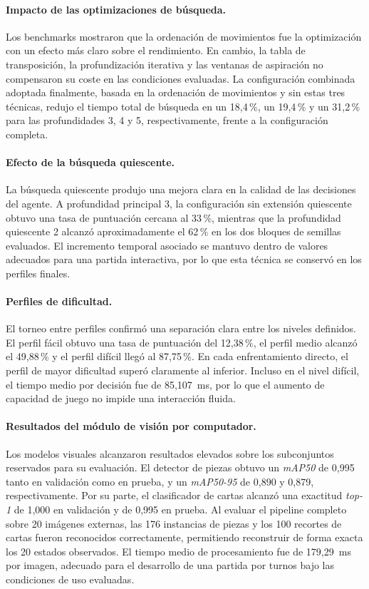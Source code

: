 \paragraph{Impacto de las optimizaciones de búsqueda.}
Los benchmarks mostraron que la ordenación de movimientos fue la optimización con un efecto más claro sobre el rendimiento. En cambio, la tabla de transposición, la profundización iterativa y las ventanas de aspiración no compensaron su coste en las condiciones evaluadas. La configuración combinada adoptada finalmente, basada en la ordenación de movimientos y sin estas tres técnicas, redujo el tiempo total de búsqueda en un 18,4\,\%, un 19,4\,\% y un 31,2\,\% para las profundidades 3, 4 y 5, respectivamente, frente a la configuración completa.

\paragraph{Efecto de la búsqueda quiescente.}
La búsqueda quiescente produjo una mejora clara en la calidad de las decisiones del agente. A profundidad principal 3, la configuración sin extensión quiescente obtuvo una tasa de puntuación cercana al 33\,\%, mientras que la profundidad quiescente 2 alcanzó aproximadamente el 62\,\% en los dos bloques de semillas evaluados. El incremento temporal asociado se mantuvo dentro de valores adecuados para una partida interactiva, por lo que esta técnica se conservó en los perfiles finales.

\paragraph{Perfiles de dificultad.}
El torneo entre perfiles confirmó una separación clara entre los niveles definidos. El perfil fácil obtuvo una tasa de puntuación del 12,38\,\%, el perfil medio alcanzó el 49,88\,\% y el perfil difícil llegó al 87,75\,\%. En cada enfrentamiento directo, el perfil de mayor dificultad superó claramente al inferior. Incluso en el nivel difícil, el tiempo medio por decisión fue de 85,107~ms, por lo que el aumento de capacidad de juego no impide una interacción fluida.

\paragraph{Resultados del módulo de visión por computador.}
Los modelos visuales alcanzaron resultados elevados sobre los subconjuntos reservados para su evaluación. El detector de piezas obtuvo un \textit{mAP50} de 0,995 tanto en validación como en prueba, y un \textit{mAP50-95} de 0,890 y 0,879, respectivamente. Por su parte, el clasificador de cartas alcanzó una exactitud \textit{top-1} de 1,000 en validación y de 0,995 en prueba. Al evaluar el pipeline completo sobre 20 imágenes externas, las 176 instancias de piezas y los 100 recortes de cartas fueron reconocidos correctamente, permitiendo reconstruir de forma exacta los 20 estados observados. El tiempo medio de procesamiento fue de 179,29~ms por imagen, adecuado para el desarrollo de una partida por turnos bajo las condiciones de uso evaluadas.

